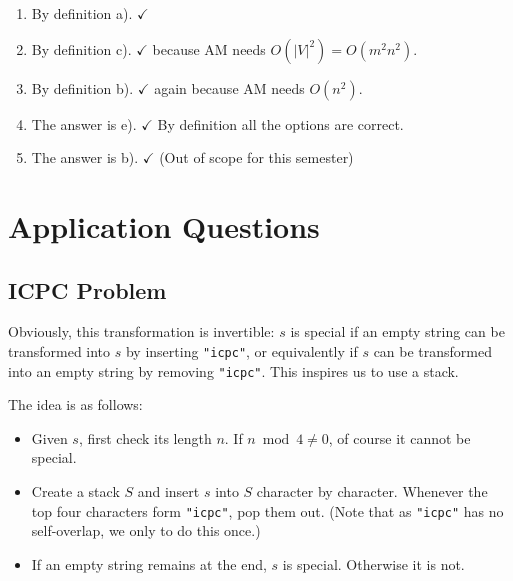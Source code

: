 \documentclass[12pt]{article}
\renewcommand{\t}{\texttt}
\begin{document}
\begin{enumerate}
\begin{enumerate}[label=\alph*).]
    \item See \href{https://leetcode.com/problems/construct-binary-tree-from-preorder-and-inorder-traversal/}{this LeetCode problem}.
    \item Similar to a).
    \item $\checkmark$ This is not possible as we cannot tell whether a child is a left child or a right child. For instance we can have $u$ as the root and $v$ either as a left or as a right child, and these yield the same preorder and postorder traversal.
    \item Recall the BST property: left subtree $<$ root and right subtree $>$ root. Thus we can recursively construct the tree.
    \item Similar to d).
\end{enumerate}
\item By definition a). $\checkmark$
\item By definition c). $\checkmark$ because AM needs $O\left(|V|^2\right)=O\left(m^2n^2\right)$.
\item By definition b). $\checkmark$ again because AM needs $O\left(n^2\right)$.
\item The answer is e). $\checkmark$ By definition all the options are correct.
\item The answer is b). $\checkmark$ (Out of scope for this semester)
\end{enumerate}
\newpage
\section{Application Questions}
\subsection{ICPC Problem}
Obviously, this transformation is invertible: $s$ is special if an empty string can be transformed into $s$ by inserting \t{"icpc"}, or equivalently if $s$ can be transformed into an empty string by removing \t{"icpc"}. This inspires us to use a stack.

The idea is as follows:
\begin{itemize}
    \item Given $s$, first check its length $n$. If $n\bmod 4\ne 0$, of course it cannot be special.
    \item Create a stack $S$ and insert $s$ into $S$ character by character. Whenever the top four characters form \t{"icpc"}, pop them out. (Note that as \t{"icpc"} has no self-overlap, we only to do this once.)
    \item If an empty string remains at the end, $s$ is special. Otherwise it is not.
\end{itemize}
\end{document}
